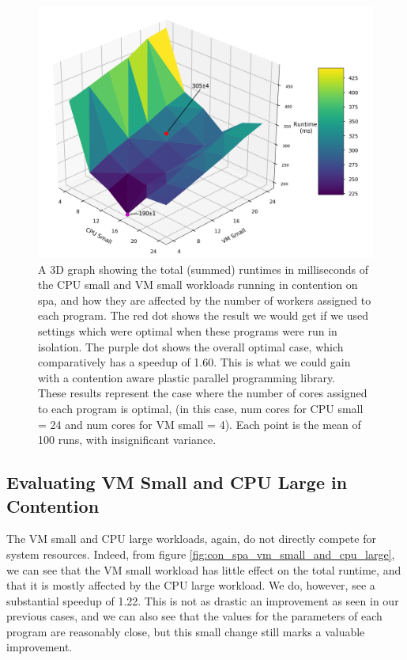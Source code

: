 \begin{figure}[H]
    \includegraphics[width=1\textwidth]{graphics/contention/spa/otwc_cpu_small_and_vm_small.png}
    \caption{A 3D graph showing the total (summed) runtimes in milliseconds of the CPU small and VM small workloads running in contention on spa, and how they are affected by the number of workers assigned to each program. The red dot shows the result we would get if we used settings which were optimal when these programs were run in isolation. The purple dot shows the overall optimal case, which comparatively has a speedup of 1.60. This is what we could gain with a contention aware plastic parallel programming library. \\
    These results represent the case where the number of cores assigned to each program is optimal, (in this case, num cores for CPU small = 24 and num cores for VM small = 4). Each point is the mean of 100 runs, with insignificant variance.}
    \label{fig:con_spa_cpu_small_and_vm_small}
\end{figure}



\subsection{Evaluating VM Small and CPU Large in Contention}
\label{section:results:evaluating_vm_small_and_cpu_large_in_contention}

The VM small and CPU large workloads, again, do not directly compete for system resources. Indeed, from figure \ref{fig:con_spa_vm_small_and_cpu_large}, we can see that the VM small workload has little effect on the total runtime, and that it is mostly affected by the CPU large workload. We do, however, see a substantial speedup of 1.22. This is not as drastic an improvement as seen in our previous cases, and we can also see that the values for the parameters of each program are reasonably close, but this small change still marks a valuable improvement.

